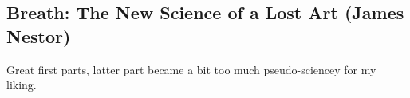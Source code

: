 \subsection{Breath: The New Science of a Lost Art (James Nestor)}

Great first parts, latter part became a bit too much pseudo-sciencey for my liking.
